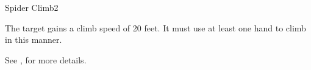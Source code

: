 \begin{spellsection}{Spider Climb}{2}
    \begin{spellheader}
    \end{spellheader}
    \begin{spellcontent}
        \begin{spelltargetinginfo}
        \end{spelltargetinginfo}
        \begin{spelleffects}
            \spelleffect The target gains a climb speed of 20 feet. It must use at least one hand to climb in this manner.
            \spelldur \durmed
        \end{spelleffects}
    \end{spellcontent}
    \begin{spellfooter}
        \spellnotes See , for more details.
        \miscastexplode
    \end{spellfooter}
\end{spellsection}

